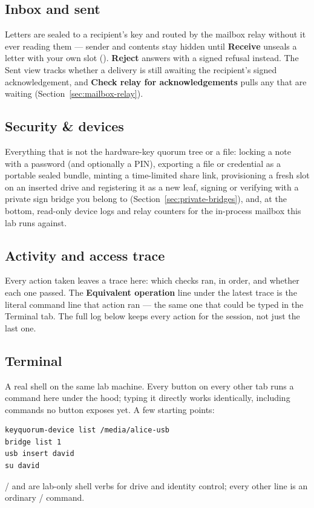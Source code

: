 \subsection{Inbox and sent}

Letters are sealed to a recipient's key and routed by the mailbox relay
without it ever reading them --- sender and contents stay hidden until
\textbf{Receive} unseals a letter with your own slot (). \textbf{Reject} answers with a signed refusal instead. The
Sent view tracks whether a delivery is still awaiting the recipient's
signed acknowledgement, and \textbf{Check relay for acknowledgements} pulls
any that are waiting (Section~\ref{sec:mailbox-relay}).

\subsection{Security \& devices}

Everything that is not the hardware-key quorum tree or a file: locking a
note with a password (and optionally a PIN), exporting a file or credential
as a portable sealed bundle, minting a time-limited share link,
provisioning a fresh slot on an inserted drive and registering it as a new
leaf, signing or verifying with a private sign bridge you belong to
(Section~\ref{sec:private-bridges}), and, at the bottom, read-only device
logs and relay counters for the in-process mailbox this lab runs against.

\subsection{Activity and access trace}
\label{sec:lab-activity}

Every action taken leaves a trace here: which checks ran, in order, and
whether each one passed. The \textbf{Equivalent operation} line under the
latest trace is the literal command line that action ran --- the same one
that could be typed in the Terminal tab. The full log below keeps every
action for the session, not just the last one.

\subsection{Terminal}
\label{sec:lab-terminal}

A real shell on the same lab machine. Every button on every other tab runs
a command here under the hood; typing it directly works identically,
including commands no button exposes yet. A few starting points:

\begin{lstlisting}
keyquorum-device list /media/alice-usb
bridge list 1
usb insert david
su david
\end{lstlisting}

 /  and  are lab-only shell
verbs for drive and identity control; every other line is an ordinary
 /  command.
